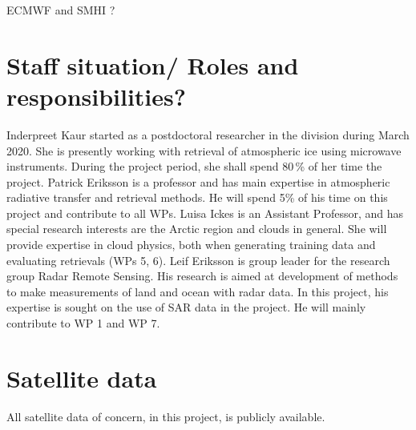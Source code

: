\documentclass[12pt,oneside,a4paper]{article}
\begin{document}
ECMWF and SMHI ?

\section{Staff situation/ Roles and responsibilities?}
\label{sec:staff}
%
Inderpreet Kaur started as a postdoctoral researcher in the division during March 2020.  She is presently working with retrieval of atmospheric ice using microwave instruments. During the project period, she shall spend 80\,\% of her time the project. Patrick Eriksson is a professor and has main expertise in atmospheric radiative transfer and retrieval methods. He will spend 5\% of his time on this project and contribute to all WPs. Luisa Ickes is an Assistant Professor, and has special research interests are the Arctic region and clouds in general. She will provide expertise in cloud physics, both when generating training data and evaluating retrievals (WPs 5, 6). Leif Eriksson is group leader for the research group Radar Remote Sensing. His research is aimed at development of methods to make measurements of land and ocean with radar data. In this project, his expertise is sought on the use of SAR data in the project. He will mainly contribute to WP 1 and WP 7. 

\section{Satellite data}
%
All satellite data of concern, in this project, is publicly available. 

{\footnotesize
	
}
\end{document}
